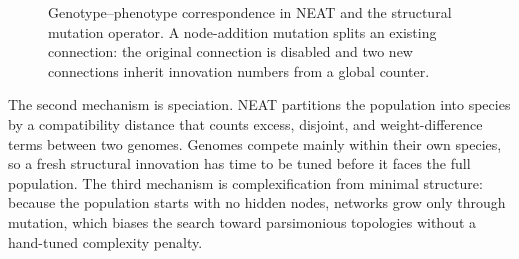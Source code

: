 \documentclass[12pt]{article}
\begin{document}
\begin{figure}[h]
\centering
{}
\caption{Genotype--phenotype correspondence in NEAT and the structural mutation operator. A node-addition mutation splits an existing connection: the original connection is disabled and two new connections inherit innovation numbers from a global counter.}
\label{fig:genotype-phenotype}
\end{figure}

The second mechanism is speciation.
NEAT partitions the population into species by a compatibility distance that counts excess, disjoint, and weight-difference terms between two genomes.
Genomes compete mainly within their own species, so a fresh structural innovation has time to be tuned before it faces the full population.
The third mechanism is complexification from minimal structure: because the population starts with no hidden nodes, networks grow only through mutation, which biases the search toward parsimonious topologies without a hand-tuned complexity penalty.



\end{document}

